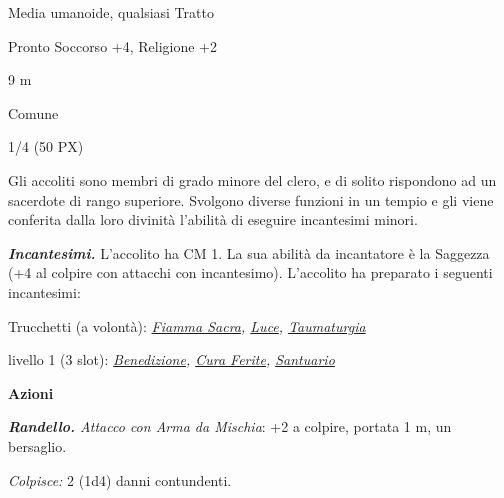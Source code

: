 \begin{multicols}{2}
{
\begin{description}[noitemsep, topsep=0pt, parsep=0pt, partopsep=0pt, itemsep=1pt, leftmargin=2.35cm,  labelwidth=2.2cm, itemindent=0cm, listparindent=0pt] %
\setlength{\baselineskip}{10pt}
\item[\textbf{Taglia/Tipo}] Media umanoide, qualsiasi Tratto
\item[\textbf{Caratt.}] 
\item[\textbf{Punti Ferita}] 
\item[\textbf{Comp.}] Pronto Soccorso +4, Religione +2
\item[\textbf{Tiri Salvez.}] 
\item[\textbf{Movimento}] 9 m
\item[\textbf{Linguaggi}] Comune
\item[\textbf{Sfida}] 1/4 (50 PX)
\end{description}
\smallskip

Gli accoliti sono membri di grado minore del clero, e di solito rispondono ad un sacerdote di rango superiore. Svolgono diverse funzioni in un tempio e gli viene conferita dalla loro divinità l'abilità di eseguire incantesimi minori.

\emph{\textbf{Incantesimi.}} L'accolito ha CM 1. La sua abilità da incantatore è la Saggezza (+4 al colpire con attacchi con incantesimo). L'accolito ha preparato i seguenti incantesimi:

Trucchetti (a volontà): \emph{\hyperlink{Fiamma Sacra}{Fiamma Sacra}, \hyperlink{Luce}{Luce}, \hyperlink{Taumaturgia}{Taumaturgia}}

livello 1 (3 slot): \emph{\hyperlink{Benedizione}{Benedizione}, \hyperlink{Cura Ferite}{Cura Ferite}, \hyperlink{Santuario}{Santuario}}

\medskip\textbf{Azioni}

\emph{\textbf{Randello.} Attacco con Arma da Mischia}: +2 a colpire, portata 1 m, un bersaglio.

\emph{Colpisce:} 2 (1d4) danni contundenti.

}
\end{multicols}
